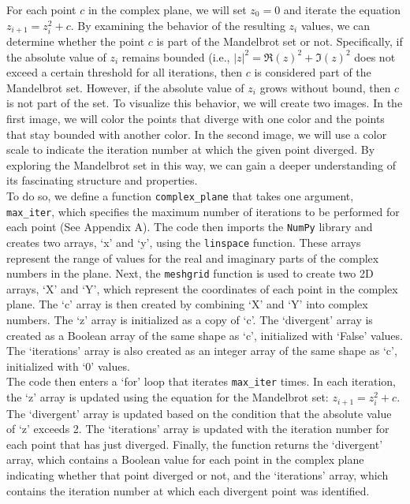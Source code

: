 \documentclass[letterpaper,10.9pt]{article}
\begin{document}
For each point $c$ in the complex plane, we will set $z_0 = 0$ and iterate the equation $z_{i + 1} = z_i^2 + c$. By examining the behavior of the resulting $z_i$ values, we can determine whether the point $c$ is part of the Mandelbrot set or not. Specifically, if the absolute value of $z_i$ remains bounded (i.e., $|z|^2 = \Re(z)^2 + \Im(z)^2$ does not exceed a certain threshold for all iterations, then $c$ is considered part of the Mandelbrot set. However, if the absolute value of $z_i$ grows without bound, then $c$ is not part of the set. To visualize this behavior, we will create two images. In the first image, we will color the points that diverge with one color and the points that stay bounded with another color. In the second image, we will use a color scale to indicate the iteration number at which the given point diverged. By exploring the Mandelbrot set in this way, we can gain a deeper understanding of its fascinating structure and properties.\\

To do so, we define a function \texttt{complex\_plane} that takes one argument, \texttt{max\_iter}, which specifies the maximum number of iterations to be performed for each point (See Appendix A). The code then imports the \texttt{NumPy} library and creates two arrays, `x' and `y', using the \texttt{linspace} function. These arrays represent the range of values for the real and imaginary parts of the complex numbers in the plane. Next, the \texttt{meshgrid} function is used to create two 2D arrays, `X' and `Y', which represent the coordinates of each point in the complex plane. The `c' array is then created by combining `X' and `Y' into complex numbers. The `z' array is initialized as a copy of `c'. The `divergent' array is created as a Boolean array of the same shape as `c', initialized with `False' values. The `iterations' array is also created as an integer array of the same shape as `c', initialized with `0' values.\\

The code then enters a `for' loop that iterates \texttt{max\_iter} times. In each iteration, the `z' array is updated using the equation for the Mandelbrot set: $z_{i+1} = z_i^2 + c$. The `divergent' array is updated based on the condition that the absolute value of `z' exceeds 2. The `iterations' array is updated with the iteration number for each point that has just diverged. Finally, the function returns the `divergent' array, which contains a Boolean value for each point in the complex plane indicating whether that point diverged or not, and the `iterations' array, which contains the iteration number at which each divergent point was identified.\\
\end{document}
